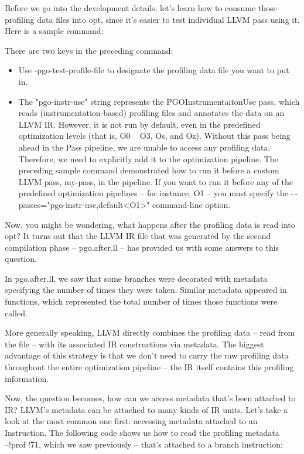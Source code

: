 Before we go into the development details, let's learn how to consume those profiling data files into opt, since it's easier to test individual LLVM pass using it. Here is a sample command:


There are two keys in the preceding command:

\begin{itemize}
\item Use -pgo-test-profile-file to designate the profiling data file you want to put in.
\item The "pgo-instr-use" string represents the PGOInstrumentaitonUse pass, which reads (instrumentation-based) profiling files and annotates the data on an LLVM IR. However, it is not run by default, even in the predefined optimization levels (that is, O0 ~ O3, Os, and Oz). Without this pass being ahead in the Pass pipeline, we are unable to access any profiling data. Therefore, we need to explicitly add it to the optimization pipeline. The preceding sample command demonstrated how to run it before a custom LLVM pass, my-pass, in the pipeline. If you want to run it before any of the predefined optimization pipelines – for instance, O1 – you must specify the -\,-passes="pgo-instr-use,default<O1>" command-line option.
\end{itemize}

Now, you might be wondering, what happens after the profiling data is read into opt? It turns out that the LLVM IR file that was generated by the second compilation phase – pgo.after.ll – has provided us with some answers to this question. 

In pgo.after.ll, we saw that some branches were decorated with metadata specifying the number of times they were taken. Similar metadata appeared in functions, which represented the total number of times those functions were called.

More generally speaking, LLVM directly combines the profiling data – read from the file – with its associated IR constructions via metadata. The biggest advantage of this strategy is that we don't need to carry the raw profiling data throughout the entire optimization pipeline – the IR itself contains this profiling information.

Now, the question becomes, how can we access metadata that's been attached to IR? LLVM's metadata can be attached to many kinds of IR units. Let's take a look at the most common one first: accessing metadata attached to an Instruction. The following code shows us how to read the profiling metadata –!prof !71, which we saw previously – that's attached to a branch instruction:


